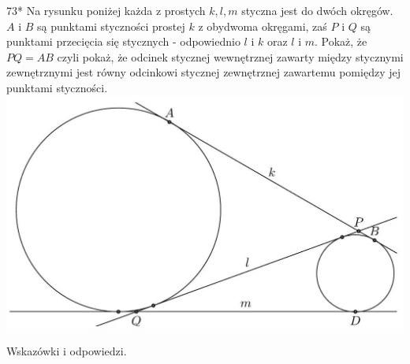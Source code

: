 \documentclass[10pt]{article}
\begin{document}
73* Na rysunku poniżej każda z prostych \(k, l, m\) styczna jest do dwóch okręgów. \(A\) i \(B\) są punktami styczności prostej \(k\) z obydwoma okręgami, zaś \(P\) i \(Q\) są punktami przecięcia się stycznych - odpowiednio \(l\) i \(k\) oraz \(l\) i \(m\). Pokaż, że \(P Q=A B\) czyli pokaż, że odcinek stycznej wewnętrznej zawarty między stycznymi zewnętrznymi jest równy odcinkowi stycznej zewnętrznej zawartemu pomiędzy jej punktami styczności.\\
\includegraphics[max width=\textwidth, center]{2024_11_21_e9b4faa005d5be2cc318g-046(1)}

Wskazówki i odpowiedzi.
\end{document}
